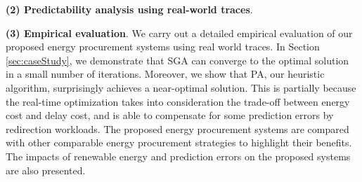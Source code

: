 \textbf{(2) Predictability analysis using real-world traces}. 

\textbf{(3) Empirical evaluation}. We carry out a detailed empirical evaluation of our proposed energy procurement systems using real world traces. In Section \ref{sec:caseStudy}, we demonstrate that SGA can converge to the optimal solution in a small number of iterations. Moreover, we show that PA, our heuristic algorithm, surprisingly achieves a near-optimal solution. This is partially because the real-time optimization takes into consideration the trade-off between energy cost and delay cost, and is able to compensate for some prediction errors by redirection workloads. The proposed energy procurement systems are compared with other comparable energy procurement strategies to highlight their benefits. The impacts of renewable energy and prediction errors on the proposed systems are also presented.